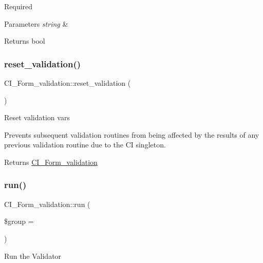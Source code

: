 Required


\begin{DoxyParams}{Parameters}
{\em string} & \\
\hline
\end{DoxyParams}
\begin{DoxyReturn}{Returns}
bool 
\end{DoxyReturn}
\mbox{\label{class_c_i___form__validation_a5527d98847f46f4e64d0f0aec2916480}} 
\subsubsection{\texorpdfstring{reset\+\_\+validation()}{reset\_validation()}}
{\footnotesize\ttfamily C\+I\+\_\+\+Form\+\_\+validation\+::reset\+\_\+validation (\begin{DoxyParamCaption}{ }\end{DoxyParamCaption})}

Reset validation vars

Prevents subsequent validation routines from being affected by the results of any previous validation routine due to the CI singleton.

\begin{DoxyReturn}{Returns}
\mbox{\hyperlink{class_c_i___form__validation}{C\+I\+\_\+\+Form\+\_\+validation}} 
\end{DoxyReturn}
\mbox{\label{class_c_i___form__validation_ab8ea7991f547f0ee4ba78cc4c0a3d4d1}} 
\subsubsection{\texorpdfstring{run()}{run()}}
{\footnotesize\ttfamily C\+I\+\_\+\+Form\+\_\+validation\+::run (\begin{DoxyParamCaption}\item[{}]{\$group = {\ttfamily \textquotesingle{}\textquotesingle{}} }\end{DoxyParamCaption})}

Run the Validator

